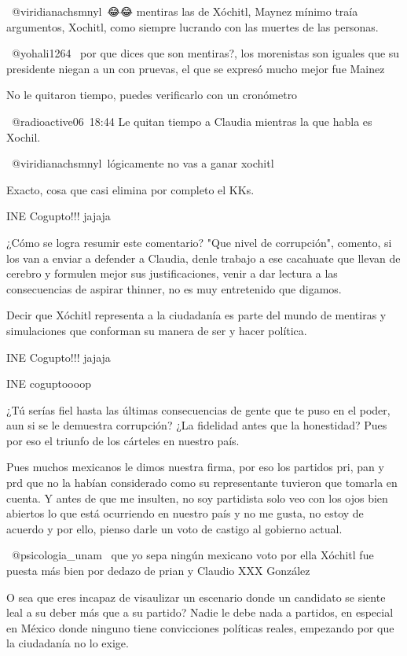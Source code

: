 ​ @viridianachsmnyl 😂😂 mentiras las de Xóchitl, Maynez mínimo traía argumentos, Xochitl, como siempre lucrando con las muertes de las personas.

​ @yohali1264  por que dices que son mentiras?, los morenistas son iguales que su presidente niegan a un con pruevas, el que se expresó mucho mejor fue Mainez

No le quitaron tiempo, puedes verificarlo con un cronómetro

​ @radioactive06 18:44 Le quitan tiempo a Claudia mientras la que habla es Xochil.

​ @viridianachsmnyl lógicamente no vas a ganar xochitl

Exacto, cosa que casi elimina por completo el KKs.

INE Cogupto!!! jajaja

¿Cómo se logra resumir este comentario? "Que nivel de corrupción", comento, si los van a enviar a defender a Claudia, denle trabajo a ese cacahuate que llevan de cerebro y formulen mejor sus justificaciones, venir a dar lectura a las consecuencias de aspirar thinner, no es muy entretenido que digamos.

Decir que Xóchitl representa a la ciudadanía es parte del mundo de mentiras y simulaciones que conforman su manera de ser y hacer política.

INE Cogupto!!! jajaja

INE coguptoooop

¿Tú serías fiel hasta las últimas consecuencias de gente que te puso en el poder, aun si se le demuestra corrupción? ¿La fidelidad antes que la honestidad? Pues por eso el triunfo de los cárteles en nuestro país.🤷🏽‍♂️

Pues muchos mexicanos le dimos nuestra firma, por eso los partidos pri, pan y prd que no la habían considerado como su representante tuvieron que tomarla en cuenta. Y antes de que me insulten, no soy partidista solo veo con los ojos bien abiertos lo que está ocurriendo en nuestro país y no me gusta, no estoy de acuerdo y por ello, pienso darle un voto de castigo al gobierno actual.

 @psicologia_unam   que yo sepa ningún mexicano voto por ella Xóchitl fue puesta más bien por dedazo de prian y Claudio XXX González

O sea que eres incapaz de visaulizar un escenario donde un candidato se siente leal a su deber más que a su partido? Nadie le debe nada a partidos, en especial en México donde ninguno tiene convicciones políticas reales, empezando por que la ciudadanía no lo exige.

